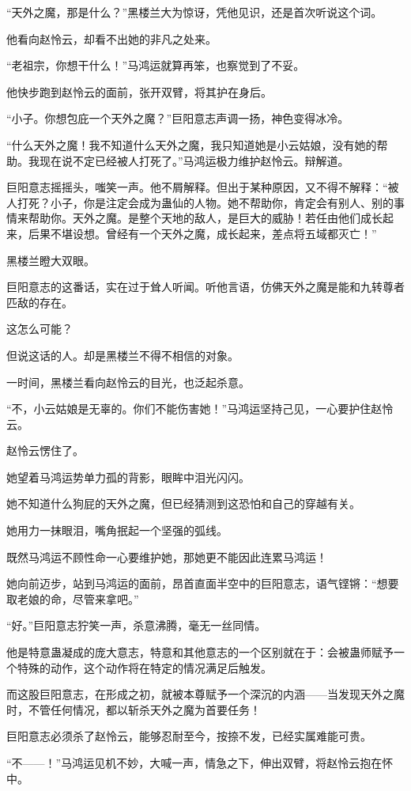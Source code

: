 \begin{this_body}
“天外之魔，那是什么？”黑楼兰大为惊讶，凭他见识，还是首次听说这个词。

他看向赵怜云，却看不出她的非凡之处来。

“老祖宗，你想干什么！”马鸿运就算再笨，也察觉到了不妥。

他快步跑到赵怜云的面前，张开双臂，将其护在身后。

“小子。你想包庇一个天外之魔？”巨阳意志声调一扬，神色变得冰冷。

“什么天外之魔！我不知道什么天外之魔，我只知道她是小云姑娘，没有她的帮助。我现在说不定已经被人打死了。”马鸿运极力维护赵怜云。辩解道。

巨阳意志摇摇头，嗤笑一声。他不屑解释。但出于某种原因，又不得不解释：“被人打死？小子，你是注定会成为蛊仙的人物。她不帮助你，肯定会有别人、别的事情来帮助你。天外之魔。是整个天地的敌人，是巨大的威胁！若任由他们成长起来，后果不堪设想。曾经有一个天外之魔，成长起来，差点将五域都灭亡！”

黑楼兰瞪大双眼。

巨阳意志的这番话，实在过于耸人听闻。听他言语，仿佛天外之魔是能和九转尊者匹敌的存在。

这怎么可能？

但说这话的人。却是黑楼兰不得不相信的对象。

一时间，黑楼兰看向赵怜云的目光，也泛起杀意。

“不，小云姑娘是无辜的。你们不能伤害她！”马鸿运坚持己见，一心要护住赵怜云。

赵怜云愣住了。

她望着马鸿运势单力孤的背影，眼眸中泪光闪闪。

她不知道什么狗屁的天外之魔，但已经猜测到这恐怕和自己的穿越有关。

她用力一抹眼泪，嘴角抿起一个坚强的弧线。

既然马鸿运不顾性命一心要维护她，那她更不能因此连累马鸿运！

她向前迈步，站到马鸿运的面前，昂首直面半空中的巨阳意志，语气铿锵：“想要取老娘的命，尽管来拿吧。”

“好。”巨阳意志狞笑一声，杀意沸腾，毫无一丝同情。

他是特意蛊凝成的庞大意志，特意和其他意志的一个区别就在于：会被蛊师赋予一个特殊的动作，这个动作将在特定的情况满足后触发。

而这股巨阳意志，在形成之初，就被本尊赋予一个深沉的内涵——当发现天外之魔时，不管任何情况，都以斩杀天外之魔为首要任务！

巨阳意志必须杀了赵怜云，能够忍耐至今，按捺不发，已经实属难能可贵。

“不——！”马鸿运见机不妙，大喊一声，情急之下，伸出双臂，将赵怜云抱在怀中。


\end{this_body}
